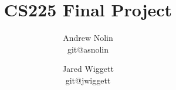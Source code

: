 \title{CS225 Final Project}
\author{Andrew Nolin \\ git@asnolin \and Jared Wiggett \\ git@jwiggett}




